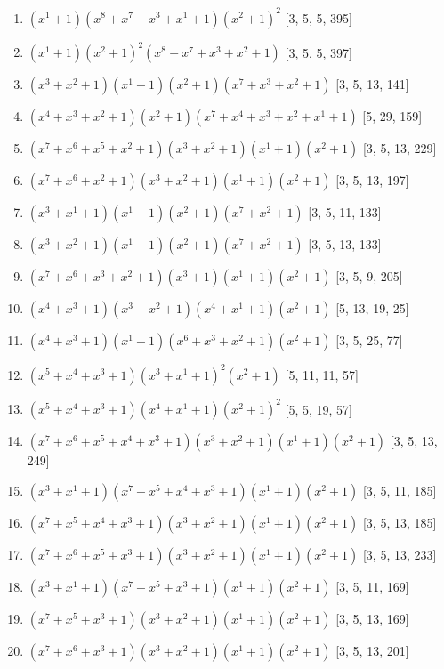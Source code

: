 \documentclass[10pt,twocolumn]{article}
\begin{document}
\begin{enumerate}
\item $(x^{1} + 1)(x^{8} + x^{7} + x^{3} + x^{1} + 1)(x^{2} + 1)^{2}$  [3, 5, 5, 395]
\item $(x^{1} + 1)(x^{2} + 1)^{2}(x^{8} + x^{7} + x^{3} + x^{2} + 1)$  [3, 5, 5, 397]
\item $(x^{3} + x^{2} + 1)(x^{1} + 1)(x^{2} + 1)(x^{7} + x^{3} + x^{2} + 1)$  [3, 5, 13, 141]
\item $(x^{4} + x^{3} + x^{2} + 1)(x^{2} + 1)(x^{7} + x^{4} + x^{3} + x^{2} + x^{1} + 1)$  [5, 29, 159]
\item $(x^{7} + x^{6} + x^{5} + x^{2} + 1)(x^{3} + x^{2} + 1)(x^{1} + 1)(x^{2} + 1)$  [3, 5, 13, 229]
\item $(x^{7} + x^{6} + x^{2} + 1)(x^{3} + x^{2} + 1)(x^{1} + 1)(x^{2} + 1)$  [3, 5, 13, 197]
\item $(x^{3} + x^{1} + 1)(x^{1} + 1)(x^{2} + 1)(x^{7} + x^{2} + 1)$  [3, 5, 11, 133]
\item $(x^{3} + x^{2} + 1)(x^{1} + 1)(x^{2} + 1)(x^{7} + x^{2} + 1)$  [3, 5, 13, 133]
\item $(x^{7} + x^{6} + x^{3} + x^{2} + 1)(x^{3} + 1)(x^{1} + 1)(x^{2} + 1)$  [3, 5, 9, 205]
\item $(x^{4} + x^{3} + 1)(x^{3} + x^{2} + 1)(x^{4} + x^{1} + 1)(x^{2} + 1)$  [5, 13, 19, 25]
\item $(x^{4} + x^{3} + 1)(x^{1} + 1)(x^{6} + x^{3} + x^{2} + 1)(x^{2} + 1)$  [3, 5, 25, 77]
\item $(x^{5} + x^{4} + x^{3} + 1)(x^{3} + x^{1} + 1)^{2}(x^{2} + 1)$  [5, 11, 11, 57]
\item $(x^{5} + x^{4} + x^{3} + 1)(x^{4} + x^{1} + 1)(x^{2} + 1)^{2}$  [5, 5, 19, 57]
\item $(x^{7} + x^{6} + x^{5} + x^{4} + x^{3} + 1)(x^{3} + x^{2} + 1)(x^{1} + 1)(x^{2} + 1)$  [3, 5, 13, 249]
\item $(x^{3} + x^{1} + 1)(x^{7} + x^{5} + x^{4} + x^{3} + 1)(x^{1} + 1)(x^{2} + 1)$  [3, 5, 11, 185]
\item $(x^{7} + x^{5} + x^{4} + x^{3} + 1)(x^{3} + x^{2} + 1)(x^{1} + 1)(x^{2} + 1)$  [3, 5, 13, 185]
\item $(x^{7} + x^{6} + x^{5} + x^{3} + 1)(x^{3} + x^{2} + 1)(x^{1} + 1)(x^{2} + 1)$  [3, 5, 13, 233]
\item $(x^{3} + x^{1} + 1)(x^{7} + x^{5} + x^{3} + 1)(x^{1} + 1)(x^{2} + 1)$  [3, 5, 11, 169]
\item $(x^{7} + x^{5} + x^{3} + 1)(x^{3} + x^{2} + 1)(x^{1} + 1)(x^{2} + 1)$  [3, 5, 13, 169]
\item $(x^{7} + x^{6} + x^{3} + 1)(x^{3} + x^{2} + 1)(x^{1} + 1)(x^{2} + 1)$  [3, 5, 13, 201]

\end{enumerate}
\end{document}
